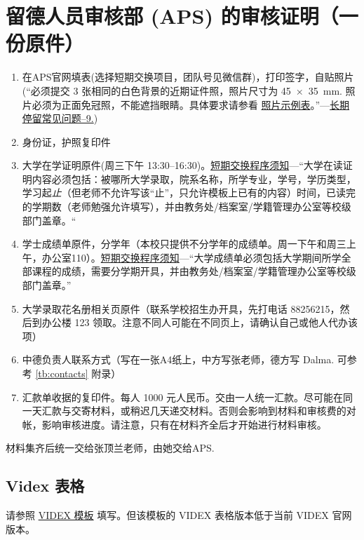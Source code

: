 \documentclass[oneside,final]{book}
\begin{document}
\section{留德人员审核部 (APS) 的审核证明（一份原件）}
\begin{enumerate}
  \item 在APS官网填表(选择短期交换项目，团队号见微信群)，打印签字，自贴照片(“必须提交 3 张相同的白色背景的近期证件照，照片尺寸为 \SI{45x35}{\mm}. 照片必须为正面免冠照，不能遮挡眼睛。具体要求请参看 \href{https://china.diplo.de/blob/1090226/8b25f160e56c0465aa9b5d5d19f89c4f/pdf-fotomustertafel-data.pdf}{照片示例表}。”---\href{https://china.diplo.de/cn-zh/service/visa-einreise/faq-national-visa/1434978}{长期停留常见问题--9.})
  \item 身份证，护照复印件
  \item 大学在学证明原件(周三下午 13:30--16:30)。\href{https://www.aps.org.cn/wp-content/uploads/260_merkblatt_verfahren_austausch_chn.pdf}{短期交换程序须知}---“大学在读证明内容必须包括：被哪所大学录取，院系名称，所学专业，学号，学历类型，学习起\emph{止}（但老师不允许写该“止”，只允许模板上已有的内容）时间，已读完的学期数（老师勉强允许填写），并由教务处/档案室/学籍管理办公室等校级部门盖章。“
  \item 学士成绩单原件，分学年（本校只提供不分学年的成绩单。周一下午和周三上午，办公室110）。\href{https://www.aps.org.cn/wp-content/uploads/260_merkblatt_verfahren_austausch_chn.pdf}{短期交换程序须知}---“大学成绩单必须包括大学期间所学全部课程的成绩，需要分学期开具，并由教务处/档案室/学籍管理办公室等校级部门盖章。”
  \item 大学录取花名册相关页原件（联系学校招生办开具，先打电话 88256215，然后到办公楼 123 领取。注意不同人可能在不同页上，请确认自己或他人代办该项）
  \item 中德负责人联系方式（写在一张A4纸上，中方写张老师，德方写 Dalma. 可参考 \ref{tb:contacts} 附录）
  \item 汇款单收据的复印件。每人 1000 元人民币。交由一人统一汇款。尽可能在同一天汇款与交寄材料，或稍迟几天递交材料。否则会影响到材料和审核费的对帐，影响审核进度。请注意，只有在材料齐全后才开始进行材料审核。
\end{enumerate}
材料集齐后统一交给张顶兰老师，由她交给APS.

\subsection{Videx 表格}
请参照 \href{https://www.aps.org.cn/wp-content/uploads/Beispiel-Videx.pdf}{VIDEX 模板} 填写。但该模板的 VIDEX 表格版本低于当前 VIDEX 官网版本。
\end{document}
